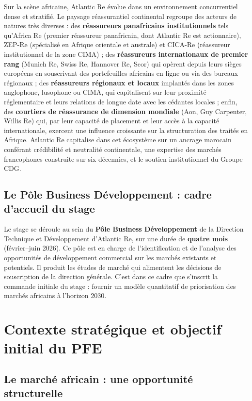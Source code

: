 \documentclass[../main.tex]{subfiles}
\begin{document}
Sur la scène africaine, Atlantic Re évolue dans un environnement concurrentiel dense
et stratifié. Le paysage réassurantiel continental regroupe des acteurs de natures
très diverses : des \textbf{réassureurs panafricains institutionnels} tels qu'Africa
Re (premier réassureur panafricain, dont Atlantic Re est actionnaire), ZEP-Re
(spécialisé en Afrique orientale et australe) et CICA-Re (réassureur institutionnel
de la zone CIMA) ; des \textbf{réassureurs internationaux de premier rang} (Munich
Re, Swiss Re, Hannover Re, Scor) qui opèrent depuis leurs sièges européens en
souscrivant des portefeuilles africains en ligne ou via des bureaux régionaux ; des
\textbf{réassureurs régionaux et locaux} implantés dans les zones anglophone, lusophone
ou CIMA, qui capitalisent sur leur proximité réglementaire et leurs relations de
longue date avec les cédantes locales ; enfin, des \textbf{courtiers de réassurance
de dimension mondiale} (Aon, Guy Carpenter, Willis Re) qui, par leur capacité de
placement et leur accès à la capacité internationale, exercent une influence croissante
sur la structuration des traités en Afrique. Atlantic Re capitalise dans cet
écosystème sur un ancrage marocain conférant crédibilité et neutralité continentale,
une expertise des marchés francophones construite sur six décennies, et le soutien
institutionnel du Groupe CDG.

\subsection{Le Pôle Business Développement : cadre d'accueil du stage}

Le stage se déroule au sein du \textbf{Pôle Business Développement} de la Direction
Technique et Développement d'Atlantic Re, sur une durée de \textbf{quatre mois}
(février--juin 2026). Ce pôle est en charge de l'identification et de l'analyse des
opportunités de développement commercial sur les marchés existants et potentiels. Il
produit les études de marché qui alimentent les décisions de souscription de la
direction générale. C'est dans ce cadre que s'inscrit la commande initiale du stage :
fournir un modèle quantitatif de priorisation des marchés africains à l'horizon 2030.

\section{Contexte stratégique et objectif initial du PFE}

\subsection{Le marché africain : une opportunité structurelle}
\end{document}
